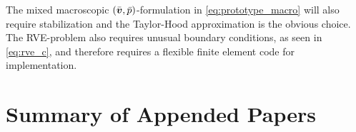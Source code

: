 \documentclass[MikaelDissertation.tex]{subfiles}
\begin{document}
The mixed macroscopic $(\bar{\boldsymbol{v}},\bar{p})$-formulation in \cref{eq:prototype_macro} will also require stabilization and the Taylor-Hood approximation is the obvious choice.
The RVE-problem also requires unusual boundary conditions, as seen in \cref{eq:rve_c}, and therefore requires a flexible finite element code for implementation.

\chapter{Summary of Appended Papers}
\end{document}
